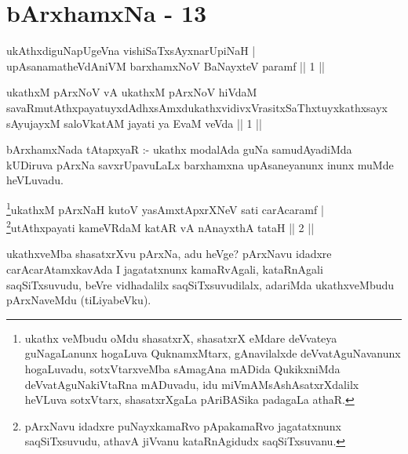 \chapter{bArxhamxNa - 13}

\begin{shl}
ukAthxdiguNapUgeVna vishiSaTxsAyxnarUpiNaH  | \\
upAsanamatheVdAniVM barxhamxNoV BaNayxteV paramf \hfill ||  1 || 
\end{shl}

\begin{kandikeshl}
ukathxM pArxNoV vA ukathxM pArxNoV hiVdaM savaRmutAthxpayatuyxdAdhxsAmxdukathxvidivxVrasitxSaThxtuyxkathxsayx sAyujayxM saloVkatAM jayati ya EvaM veVda || 1 ||
\end{kandikeshl}

\begin{artha}
bArxhamxNada tAtapxyaR :- ukathx modalAda guNa samudAyadiMda kUDiruva pArxNa savxrUpavuLaLx barxhamxna upAsaneyanunx inunx muMde heVLuvadu.
\end{artha}


\begin{shl}
\footnote{ukathx veMbudu oMdu shasatxrX, shasatxrX eMdare deVvateya guNagaLanunx hogaLuva QuknamxMtarx, gAnavilalxde deVvatAguNavanunx hogaLuvadu, sotxVtarxveMba sAmagAna mADida QukikxniMda deVvatAguNakiVtaRna mADuvadu, idu miVmAMsAshAsatxrXdalilx heVLuva sotxVtarx, shasatxrXgaLa pAriBASika padagaLa athaR.}ukathxM pArxNaH kutoV yasAmxtApxrXNeV sati carAcaramf | \\
\footnote{pArxNavu idadxre puNayxkamaRvo pApakamaRvo jagatatxnunx saqSiTxsuvudu, athavA jiVvanu kataRnAgidudx saqSiTxsuvanu.}utAthxpayati kameVRdaM katAR vA nAnayxthA tataH \hfill ||  2 || 
\end{shl}

\begin{artha}
ukathxveMba shasatxrXvu pArxNa, adu heVge? pArxNavu idadxre carAcarAtamxkavAda I jagatatxnunx kamaRvAgali, kataRnAgali saqSiTxsuvudu, beVre vidhadalilx saqSiTxsuvudilalx, adariMda ukathxveMbudu pArxNaveMdu (tiLiyabeVku).
\end{artha}

